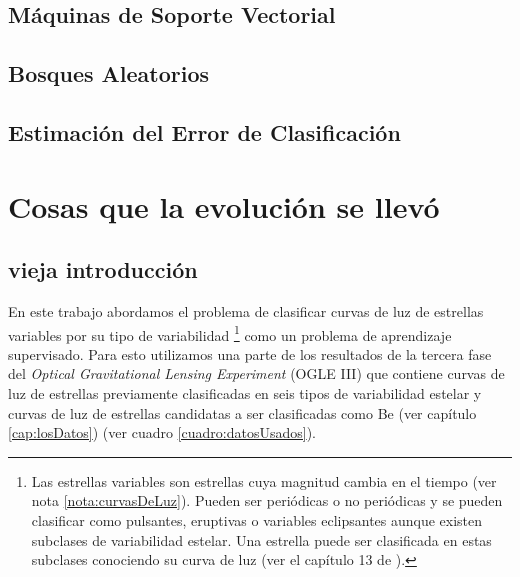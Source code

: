 \documentclass[letterpaper,12pt]{book}
\begin{document}
\section{Máquinas de Soporte Vectorial}

\section{Bosques Aleatorios}

\section{Estimación del Error de Clasificación}\label{sec:estimacionError}


\chapter{Cosas que la evolución se llevó}

\section{vieja introducción}
En este trabajo abordamos el problema de clasificar curvas de luz de estrellas variables por su tipo de variabilidad \footnote{Las estrellas variables son estrellas cuya magnitud cambia en el tiempo (ver nota \ref{nota:curvasDeLuz}). Pueden ser periódicas o no periódicas y se pueden clasificar como pulsantes, eruptivas o variables eclipsantes aunque existen subclases de variabilidad estelar. Una estrella puede ser clasificada en estas subclases conociendo su curva de luz (ver el capítulo 13 de \cite{karttunen_fundamental_2007}).} como un problema de aprendizaje supervisado. Para esto utilizamos una parte de los resultados de la tercera fase del \textit{Optical Gravitational Lensing Experiment} (OGLE III) que contiene curvas de luz  de estrellas previamente clasificadas en seis tipos de variabilidad estelar y curvas de luz de estrellas candidatas a ser clasificadas como Be (ver capítulo \ref{cap:losDatos}) (ver cuadro \ref{cuadro:datosUsados}). 
\end{document}
